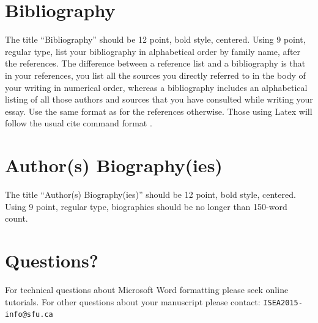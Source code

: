 \documentclass[letterpaper]{article}
\begin{document}
\section{Bibliography}
The title ``Bibliography'' should be 12 point, bold style, centered. Using 9 point, regular type, list your bibliography in alphabetical order by family name, after the references. The difference between a reference list and a bibliography is that in your references, you list all the sources you directly referred to in the body of your writing in numerical order, whereas a bibliography includes an alphabetical listing of all those authors and sources that you have consulted while writing your essay. Use the same format as for the references otherwise. Those using Latex will follow the usual cite command format \cite{boden92}.

\section{Author(s) Biography(ies)}
The title ``Author(s) Biography(ies)'' should be 12 point, bold style, centered. Using 9 point, regular type, biographies should be no longer than 150-word count.

\section{Questions?}

For technical questions about Microsoft Word formatting please seek online tutorials. For other questions about your manuscript please contact: {\tt ISEA2015-info@sfu.ca}




\end{document}
